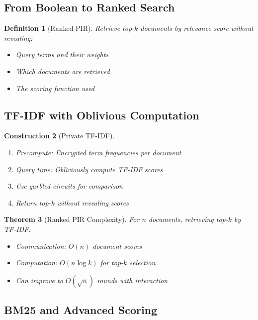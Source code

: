 \documentclass[11pt,final]{article}
\newtheorem{theorem}{Theorem}[section]
\newtheorem{definition}[theorem]{Definition}
\newtheorem{construction}[theorem]{Construction}
\begin{document}
\subsection{From Boolean to Ranked Search}

\begin{definition}[Ranked PIR]
Retrieve top-$k$ documents by relevance score without revealing:
\begin{itemize}
    \item Query terms and their weights
    \item Which documents are retrieved
    \item The scoring function used
\end{itemize}
\end{definition}

\subsection{TF-IDF with Oblivious Computation}

\begin{construction}[Private TF-IDF]
\begin{enumerate}
    \item Precompute: Encrypted term frequencies per document
    \item Query time: Obliviously compute TF-IDF scores
    \item Use garbled circuits for comparison
    \item Return top-$k$ without revealing scores
\end{enumerate}
\end{construction}

\begin{theorem}[Ranked PIR Complexity]
For $n$ documents, retrieving top-$k$ by TF-IDF:
\begin{itemize}
    \item Communication: $O(n)$ document scores
    \item Computation: $O(n \log k)$ for top-$k$ selection
    \item Can improve to $O(\sqrt{n})$ rounds with interaction
\end{itemize}
\end{theorem}

\subsection{BM25 and Advanced Scoring}
\end{document}
